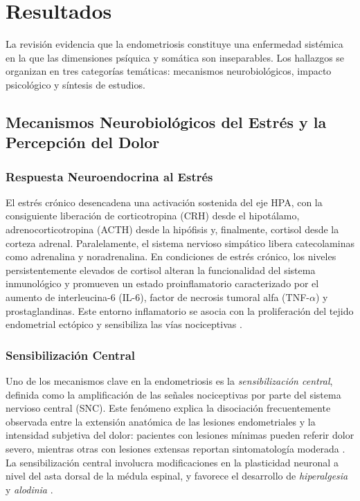 \documentclass[12pt, a4paper]{article}
\begin{document}
\section{Resultados}

La revisión evidencia que la endometriosis constituye una enfermedad sistémica en la que las
dimensiones psíquica y somática son inseparables. Los hallazgos se organizan en tres
categorías temáticas: mecanismos neurobiológicos, impacto psicológico y síntesis de estudios.

\subsection{Mecanismos Neurobiológicos del Estrés y la Percepción del Dolor}

\subsubsection{Respuesta Neuroendocrina al Estrés}

El estrés crónico desencadena una activación sostenida del eje HPA, con la consiguiente
liberación de corticotropina (CRH) desde el hipotálamo, adrenocorticotropina (ACTH) desde la
hipófisis y, finalmente, cortisol desde la corteza adrenal. Paralelamente, el sistema nervioso
simpático libera catecolaminas como adrenalina y noradrenalina. En condiciones de estrés
crónico, los niveles persistentemente elevados de cortisol alteran la funcionalidad del sistema
inmunológico y promueven un estado proinflamatorio caracterizado por el aumento de
interleucina-6 (IL-6), factor de necrosis tumoral alfa (TNF-$\alpha$) y prostaglandinas. Este
entorno inflamatorio se asocia con la proliferación del tejido endometrial ectópico y
sensibiliza las vías nociceptivas \parencite{Chen2025, Machairiotis2021}.

\subsubsection{Sensibilización Central}

Uno de los mecanismos clave en la endometriosis es la \textit{sensibilización central},
definida como la amplificación de las señales nociceptivas por parte del sistema nervioso
central (SNC). Este fenómeno explica la disociación frecuentemente observada entre la
extensión anatómica de las lesiones endometriales y la intensidad subjetiva del dolor: pacientes
con lesiones mínimas pueden referir dolor severo, mientras otras con lesiones extensas reportan
sintomatología moderada \parencite{AsSanie2012, Morotti2014}. La sensibilización central
involucra modificaciones en la plasticidad neuronal a nivel del asta dorsal de la médula espinal,
y favorece el desarrollo de \textit{hiperalgesia} y \textit{alodinia} \parencite{Maddern2020}.
\end{document}
